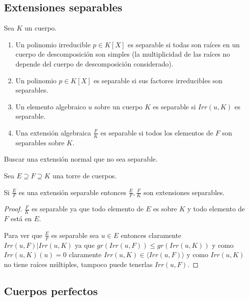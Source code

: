 \subsection{Extensiones separables}

\begin{definition}[Separabilidad]
Sea $K$ un cuerpo. 

\begin{enumerate}
\item Un polinomio irreducible $p \in K[X]$ es separable si todas son raíces en un cuerpo de descomposición son simples (la multiplicidad de las raíces no depende del cuerpo de descomposición considerado).
\item Un polinomio $p \in K[X]$ es separable si sus factores irreducibles son separables. 
\item Un elemento algebraico $u$ sobre un cuerpo $K$ es separable si $Irr(u,K)$ es separable.
\item Una extensión algebraica $\frac{F}{K}$ es separable si todos los elementos de $F$ son separables sobre $K$.  
\end{enumerate}
\end{definition}

\begin{exercise}
Buscar una extensión normal que no sea separable.
\end{exercise}

\begin{proposition}
Sea $E \supseteq F \supseteq K$ una torre de cuerpos. 

Si $\frac{E}{F}$ es una extensión separable entonces 
$\frac{E}{F},\frac{F}{K}$ son extensiones separables. 
\end{proposition}
\begin{proof}
$\frac{F}{K}$ es separable ya que todo elemento de $E$ es  sobre $K$ y todo elemento de $F$ está en $E$. 

Para ver que $\frac{E}{F}$ es separable sea $u \in E$ entonces claramente $Irr(u,F)|Irr(u,K)$ ya que $gr(Irr(u,F)) \le gr(Irr(u,K))$ y como $Irr(u,K)(u) = 0$ claramente $Irr(u,K) \in \langle Irr(u,F) \rangle$ y como $Irr(u,K)$ no tiene raíces múltiples, tampoco puede tenerlas $Irr(u,F)$. 
\end{proof}

\subsection{Cuerpos perfectos}

